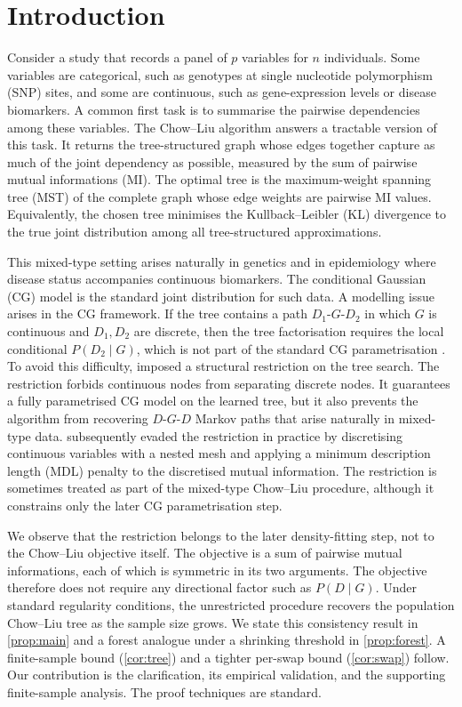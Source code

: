 \section{Introduction}
\label{sec:intro}

Consider a study that records a panel of $p$ variables for $n$
individuals. Some variables are categorical, such as genotypes at
single nucleotide polymorphism (SNP) sites, and some are continuous,
such as gene-expression levels or disease biomarkers. A common first
task is to summarise the pairwise dependencies among these
variables. The Chow--Liu algorithm \citep{chow1968approximating} answers a
tractable version of this task. It returns the tree-structured graph whose edges together capture as
much of the joint dependency as possible, measured by the
sum of pairwise mutual informations (MI). The optimal tree is the maximum-weight spanning tree (MST) of
the complete graph whose edge weights are pairwise MI values.
Equivalently, the chosen tree minimises the
Kullback--Leibler (KL) divergence to the true joint distribution
among all tree-structured approximations.

This mixed-type setting arises naturally in genetics
\citep{rockman2006genetics, nica2013expression} and in
epidemiology where disease status accompanies continuous
biomarkers. The conditional Gaussian (CG) model
\citep{lauritzen1989graphical, lauritzen1996graphical} is the standard
joint distribution for such data. A modelling issue arises in
the CG framework. If the tree contains a path $D_1$-$G$-$D_2$ in which
$G$ is continuous and $D_1, D_2$ are discrete, then the tree
factorisation requires the local conditional $P(D_2 \mid G)$, which
is not part of the standard CG parametrisation
\citep{whittaker1990graphical}. To avoid
this difficulty, \citet{edwards2010selecting} imposed a structural
restriction on the tree search. The restriction forbids continuous
nodes from separating discrete nodes. It guarantees a fully
parametrised CG model on the learned tree, but it also prevents the
algorithm from recovering $D$-$G$-$D$ Markov paths that arise
naturally in mixed-type data. \citet{suzuki2017chow} subsequently evaded the restriction in
practice by discretising continuous
variables with a nested mesh and applying a minimum description
length (MDL) penalty to the discretised mutual information. The
restriction is sometimes treated as part of the mixed-type
Chow--Liu procedure, although it constrains only the later CG
parametrisation step.

We observe that the restriction belongs to the later
density-fitting step, not to the Chow--Liu objective itself. The
objective is a sum of pairwise mutual informations, each of which is
symmetric in its two arguments. The objective therefore does not require any directional factor such
as $P(D \mid G)$. Under
standard regularity conditions, the unrestricted procedure recovers
the population Chow--Liu tree as the sample size grows. We state
this consistency result in \cref{prop:main} and a forest analogue
under a shrinking threshold in \cref{prop:forest}. A finite-sample
bound (\cref{cor:tree}) and a tighter per-swap bound
(\cref{cor:swap}) follow. Our contribution is the clarification, its
empirical validation, and the supporting finite-sample analysis. The
proof techniques are standard.

